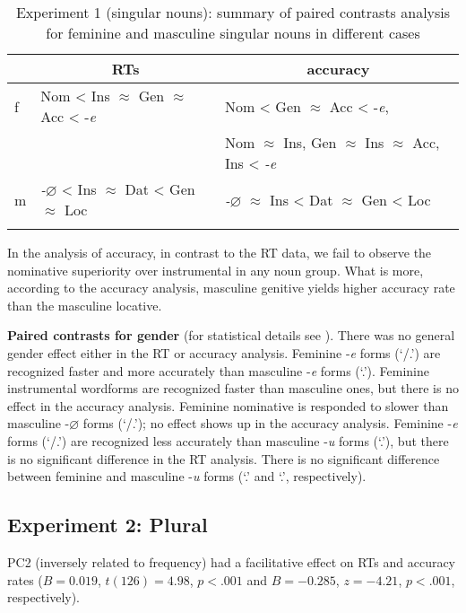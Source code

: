 \documentclass[output=paper, modfonts,newtxmath,hidelinks]{langscibook}
\begin{document}
\begin{table}
	\caption{Experiment 1 (singular nouns): summary of paired contrasts analysis for feminine and masculine singular nouns in different cases}
    \label{tab:caseSgHierarchy}
    \begin{tabular}{*{3}l}
    \lsptoprule
    ~	&	\multicolumn{1}{c}{RTs}	&	\multicolumn{1}{c}{accuracy}\\
    \midrule
    f	&	Nom < Ins $\approx$ Gen $\approx$ Acc < -\textit{e}	&	Nom < Gen $\approx$ Acc < -\textit{e}, \\
    ~	&	~	&	Nom $\approx$ Ins, Gen $\approx$ Ins $\approx$ Acc, Ins < \textit{-e}\\
    m	&	\textit{-$\varnothing$} < Ins $\approx$ Dat < Gen $\approx$ Loc	&	\textit{-$\varnothing$} $\approx$ Ins < Dat $\approx$ Gen  < Loc			\\
    \lspbottomrule
    \end{tabular}
\end{table}

In the analysis of accuracy, in contrast to the RT data, we fail to observe the nominative superiority over instrumental in any noun group. What is more, according to the accuracy analysis, masculine genitive yields higher accuracy rate than the masculine locative. 

\textbf{Paired contrasts for gender} (for statistical details see ). There was no general gender effect either in the RT or accuracy analysis. Feminine -\textit{e} forms (`\datt/\locc.\fem') are recognized faster and more accurately than masculine -\textit{e} forms (`\locc.\masc'). Feminine instrumental wordforms are recognized faster than masculine ones, but there is no effect in the accuracy analysis. Feminine nominative is responded to slower than masculine -$\varnothing$ forms (`\nomm/\accc.\masc'); no effect shows up in the accuracy analysis. Feminine -\textit{e} forms (`\datt/\locc.\fem') are recognized less accurately than masculine -\textit{u}  forms (`\datt.\masc'), but there is no significant difference in the RT analysis. There is no significant difference between feminine and masculine -\textit{u} forms (`\accc.\fem' and `\datt.\masc', respectively).

\subsection{Experiment 2: Plural}

PC2 (inversely related to frequency) had a facilitative effect on RTs and accuracy rates ($B= 0.019$, $t(126)= 4.98$, $p< .001$ and $B = -0.285$, $z= -4.21$, $p< .001$, respectively). 
\end{document}
